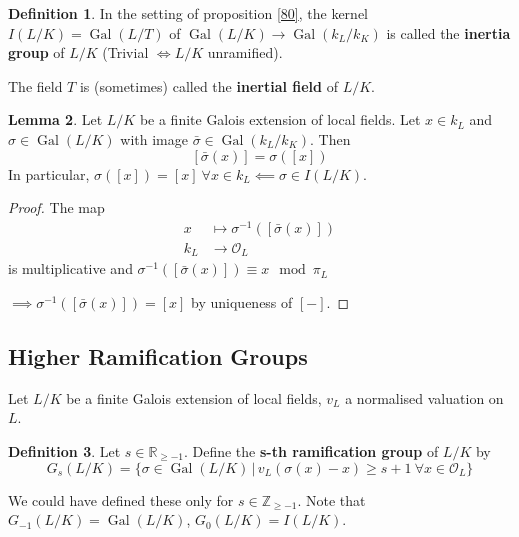 \documentclass[a4paper]{article}
\theoremstyle{definition}
\newtheorem{definition}{Definition}
\theoremstyle{default}
\newtheorem{lemma}[definition]{Lemma}
\theoremstyle{remark}
\DeclareMathOperator{\Gal}{Gal}
\begin{document}
\begin{definition}
	In the setting of proposition \ref{80},
	the kernel $I(L/K) = \Gal(L/T)$ of $\Gal(L/K) \to \Gal(k_L/k_K)$ is called the \textbf{inertia group} of $L/K$
	(Trivial $\iff L/K$ unramified).
	
	The field $T$ is (sometimes) called the \textbf{inertial field} of $L/K$.
\end{definition}

\begin{lemma}
	Let $L/K$ be a finite Galois extension of local fields.
	Let $x \in k_L$ and $\sigma \in \Gal(L/K)$ with image $\bar{\sigma} \in \Gal(k_L/k_K)$.
	Then
	$$[\bar{\sigma}(x)] = \sigma([x])$$
	In particular, $\sigma([x]) = [x]\ \forall x \in k_L \impliedby \sigma \in I(L/K)$.
	\label{82}
\end{lemma}
\begin{proof}
	The map
	\begin{align*}
		x &\mapsto \sigma^{-1}([\bar{\sigma}(x)]) \\
		k_L & \to \mathcal{O}_L
	\end{align*}
	is multiplicative and $\sigma^{-1}([\bar{\sigma}(x)]) \equiv x \mod \pi_L$
	
	$\implies \sigma^{-1}([\bar{\sigma}(x)]) = [x]$ by uniqueness of $[-]$.
\end{proof}

\subsection{Higher Ramification Groups}
Let $L/K$ be a finite Galois extension of local fields, $v_L$ a normalised valuation on $L$.

\begin{definition}
	Let $s \in \mathbb{R}_{\geq -1}$.
	Define the \textbf{s-th ramification group} of $L/K$ by
	$$G_s(L/K) = \{\sigma \in \Gal(L/K) \,|\, v_L(\sigma(x) - x) \geq s + 1 \ \forall x \in \mathcal{O}_L \}$$
\end{definition}

We could have defined these only for $s \in \mathbb{Z}_{\geq -1}$.
Note that $G_{-1}(L/K) = \Gal(L/K)$, $G_0(L/K) = I(L/K)$.
\end{document}
